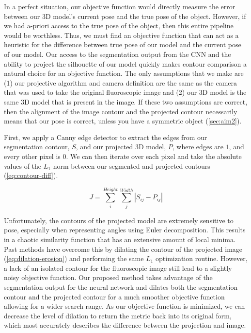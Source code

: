 In a perfect situation, our objective function would directly measure the error between our 3D model's current pose and the true pose of the object. However, if we had a-priori access to the true pose of the object, then this entire pipeline would be worthless. Thus, we must find an objective function that can act as a heuristic for the difference between true pose of our model and the current pose of our model. Our access to the segmentation output from the CNN and the ability to project the silhouette of our model quickly makes contour comparison a natural choice for an objective function. The only assumptions that we make are (1) our projective algorithm and camera definition are the same as the camera that was used to take the original fluoroscopic image and (2) our 3D model is the same 3D model that is present in the image. If these two assumptions are correct, then the alignment of the image contour and the projected contour necessarily means that our pose is correct, unless you have a symmetric object (\cref{sec:aim2}).

First, we apply a Canny edge detector \cite{cannyComputationalApproachEdge1986} to extract the edges from our segmentation contour, $S$, and our projected 3D model, $P$, where edges are $1$, and every other pixel is $0$. We can then iterate over each pixel and take the absolute values of the $L_1$ norm between our segmented and projected contours (\cref{eq:contour-diff}).

\begin{equation}
    J = \sum_i^{Height}\sum_j^{Width}|S_{ij} - P_{ij}|
    \label{eq:contour-diff}
\end{equation}

Unfortunately, the contours of the projected model are extremely sensitive to pose, especially when representing angles using Euler decomposition. This results in a chaotic similarity function that has an extensive amount of local minima. Past methods have overcome this by dilating the contour of the projected image (\cref{eq:dilation-erosion}) and performing the same $L_1$ optimization routine. However, a lack of an isolated contour for the fluoroscopic image still lead to a slightly noisy objective function. Our proposed method takes advantage of the segmentation output for the neural network and dilates both the segmentation contour and the projected contour for a much smoother objective function allowing for a wider search range. As our objective function is minimized, we can decrease the level of dilation to return the metric back into its original form, which most accurately describes the difference between the projection and image.

